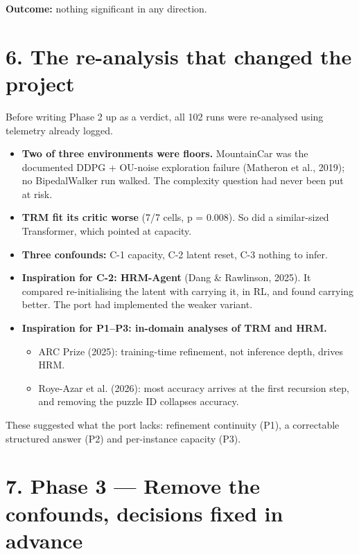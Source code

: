 \documentclass[11pt]{article}
\begin{document}
\textbf{Outcome:} nothing significant in any direction.



\section*{6. The re-analysis that changed the project}



Before writing Phase 2 up as a verdict, all 102 runs were re-analysed using telemetry already logged.



\begin{itemize}
\item \textbf{Two of three environments were floors.} MountainCar was the documented DDPG + OU-noise exploration failure (Matheron et al., 2019); no BipedalWalker run walked. The complexity question had never been put at risk.
\item \textbf{TRM fit its critic worse} (7/7 cells, p = 0.008). So did a similar-sized Transformer, which pointed at capacity.
\item \textbf{Three confounds:} C-1 capacity, C-2 latent reset, C-3 nothing to infer.
\item \textbf{Inspiration for C-2: HRM-Agent} (Dang \& Rawlinson, 2025). It compared re-initialising the latent with carrying it, in RL, and found carrying better. The port had implemented the weaker variant.
\item \textbf{Inspiration for P1--P3: in-domain analyses of TRM and HRM.}
\begin{itemize}
\item ARC Prize (2025): training-time refinement, not inference depth, drives HRM.
\item Roye-Azar et al. (2026): most accuracy arrives at the first recursion step, and removing the puzzle ID collapses accuracy.
\end{itemize}
\end{itemize}



These suggested what the port lacks: refinement continuity (P1), a correctable structured answer (P2) and per-instance capacity (P3).



\section*{7. Phase 3 --- Remove the confounds, decisions fixed in advance}
\end{document}
